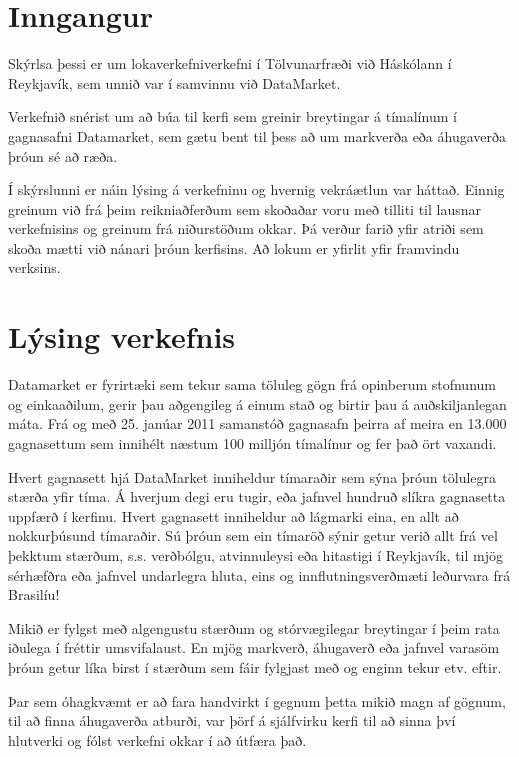 \documentclass{article}
\begin{document}
\tableofcontents
\newpage

\section{Inngangur}
Skýrlsa þessi er um lokaverkefniverkefni í Tölvunarfræði við Háskólann í Reykjavík, 
sem unnið var í samvinnu við DataMarket.

Verkefnið snérist um að búa til kerfi sem greinir
breytingar á tímalínum í gagnasafni Datamarket, 
sem gætu bent til þess að um markverða eða áhugaverða þróun sé að ræða.

Í skýrslunni er náin lýsing á verkefninu og hvernig vekráætlun var háttað.
Einnig greinum við frá þeim reikniaðferðum sem skoðaðar voru með tilliti til 
lausnar verkefnisins og greinum frá niðurstöðum okkar. Þá 
verður farið yfir atriði sem skoða mætti við nánari þróun kerfisins.
Að lokum er yfirlit yfir framvindu verksins.

\newpage
\section{Lýsing verkefnis}
Datamarket er fyrirtæki sem tekur sama töluleg gögn frá opinberum
stofnunum og einkaaðilum, gerir þau aðgengileg á einum stað og birtir þau á
auðskiljanlegan máta. Frá og með 25. janúar 2011 samanstóð gagnasafn þeirra 
af meira en 13.000 gagnasettum sem innihélt næstum 100 milljón tímalínur og 
fer það ört vaxandi.


Hvert gagnasett hjá DataMarket inniheldur tímaraðir sem sýna þróun tölulegra stærða yfir tíma. 
Á hverjum degi eru tugir, eða jafnvel hundruð slíkra gagnasetta uppfærð í kerfinu. 
Hvert gagnasett inniheldur að lágmarki eina, en allt að nokkurþúsund tímaraðir. Sú
þróun sem ein tímaröð sýnir getur verið allt frá vel
þekktum stærðum, s.s. verðbólgu, atvinnuleysi eða
hitastigi í Reykjavík, til mjög sérhæfðra eða jafnvel
undarlegra hluta, eins og innflutningsverðmæti
leðurvara frá Brasilíu!

Mikið er fylgst með algengustu stærðum og
stórvægilegar breytingar í þeim rata iðulega í fréttir
umsvifalaust. En mjög markverð, áhugaverð eða jafnvel
varasöm þróun getur líka birst í stærðum sem fáir
fylgjast með og enginn tekur etv. eftir. 

Þar sem óhagkvæmt er að fara handvirkt í gegnum þetta mikið magn af gögnum, 
til að finna áhugaverða atburði, var þörf á sjálfvirku kerfi til að 
sinna því hlutverki og fólst verkefni okkar í að útfæra það.
\end{document}
